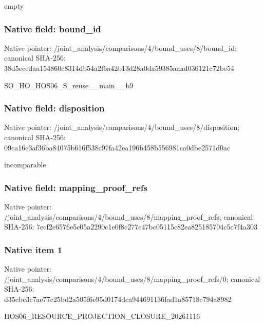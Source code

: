 \documentclass[10pt,a4paper]{article}
\begin{document}
\begingroup\raggedright\sloppy empty\par\endgroup

\subsubsection{Native field: bound\_\allowbreak{}id}
Native pointer: /joint\_\allowbreak{}analysis/comparisons/4/bound\_\allowbreak{}uses/8/bound\_\allowbreak{}id; canonical SHA-256: 38d5ecedaa154860c8314db54a2f6a42b13d28a0da59385aaad036121c72be54

\begingroup\raggedright\sloppy SO\_\allowbreak{}HO\_\allowbreak{}HOS06\_\allowbreak{}S\_\allowbreak{}reuse\_\allowbreak{}\_\allowbreak{}main\_\allowbreak{}\_\allowbreak{}b9\par\endgroup

\subsubsection{Native field: disposition}
Native pointer: /joint\_\allowbreak{}analysis/comparisons/4/bound\_\allowbreak{}uses/8/disposition; canonical SHA-256: 09ca16e3af36ba84075b616f538c97fa42ea196b458b556981ca0dbe2571d0ac

\begingroup\raggedright\sloppy incomparable\par\endgroup

\subsubsection{Native field: mapping\_\allowbreak{}proof\_\allowbreak{}refs}
Native pointer: /joint\_\allowbreak{}analysis/comparisons/4/bound\_\allowbreak{}uses/8/mapping\_\allowbreak{}proof\_\allowbreak{}refs; canonical SHA-256: 7ecf2c6576e5c05a2290c1e0f8c277e47bc05115c82ea825185704c5c7f4a303

\subsubsection{Native item 1}
Native pointer: /joint\_\allowbreak{}analysis/comparisons/4/bound\_\allowbreak{}uses/8/mapping\_\allowbreak{}proof\_\allowbreak{}refs/0; canonical SHA-256: d35cbc3c7ae77c25bd2a505f6e95d0174dca944691136fad1a85718c794a8982

\begingroup\raggedright\sloppy HOS06\_\allowbreak{}RESOURCE\_\allowbreak{}PROJECTION\_\allowbreak{}CLOSURE\_\allowbreak{}20261116\par\endgroup
\end{document}
